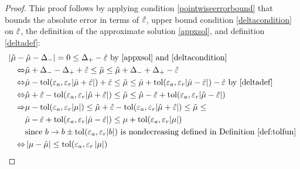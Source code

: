 \documentclass{iitthesis}
\theoremstyle{definition}
\begin{document}
 \begin{proof}
 This proof follows by applying condition \eqref{pointwiseerrorbound} that bounds the absolute error in terms of $\hat{\varepsilon}$, upper bound condition \eqref{deltacondition} on $\hat{\varepsilon}$, the definition of the approximate solution \eqref{appxsol}, and definition \eqref{deltadef}:
\begin{align*}
\MoveEqLeft
|\tmu -\hmu - \Delta_{-}| = 0 \leq \Delta_{+}- \hat{\varepsilon}  \text{ by } \eqref{appxsol} \text{ and } \eqref{deltacondition} \\ 
\Leftrightarrow 
&\hmu+\Delta_- - \Delta_{+} + \hat{\varepsilon} \leq \tilde{\mu}  \leq \hat{\mu} +\Delta_{-}+\Delta_{+}-\hat{\varepsilon} \\ \Leftrightarrow 
&\hat{\mu} -\text{tol} (\varepsilon_a, \varepsilon_r |\hat{\mu} +\hat{\varepsilon}|)+ \hat{\varepsilon} \leq \tilde{\mu}  \leq \hat{\mu}  +\text{tol} (\varepsilon_a, \varepsilon_r |\hat{\mu} -\hat{\varepsilon} |)-\hat{\varepsilon}  \text{ by } \eqref{deltadef}\\
\Leftrightarrow 
&\hat{\mu} + \hat{\varepsilon}  -\text{tol} (\varepsilon_a, \varepsilon_r |\hat{\mu} +\hat{\varepsilon} |) \leq \tilde{\mu}  \leq \hat{\mu} -\hat{\varepsilon} +\text{tol} (\varepsilon_a, \varepsilon_r |\hat{\mu} -\hat{\varepsilon} |) \\
\Rightarrow &
\mu -\text{tol} (\varepsilon_a, \varepsilon_r |\mu|) \leq\hat{\mu} + \hat{\varepsilon}  -\text{tol} (\varepsilon_a, \varepsilon_r |\hat{\mu} +\hat{\varepsilon} |) \leq \tilde{\mu}  \leq \\
& \hat{\mu} -\hat{\varepsilon} +\text{tol} (\varepsilon_a, \varepsilon_r |\hat{\mu} -\hat{\varepsilon} |)  \leq \mu+\text{tol} (\varepsilon_a, \varepsilon_r |\mu|) \\
& \text{since } b \to b \pm \tol (\varepsilon_a,\varepsilon_r |b|) \text{ is nondecreasing defined in Definition \ref{def:tolfun}}\\ 
\Leftrightarrow &
\abs{\mu-\tmu} \leq \tol(\varepsilon_a, \varepsilon_r \abs{\mu}) 
\end{align*}
\end{proof}

\label{sec:algmeanMCg}
\end{document}
